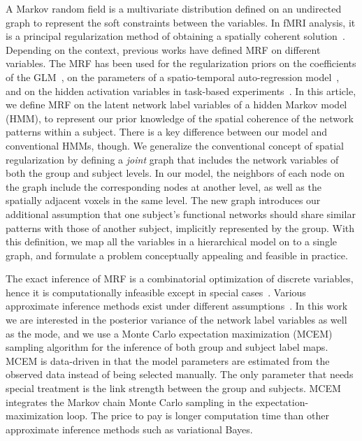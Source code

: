 \documentclass[review,authoryear]{elsarticle}
\begin{document}
A Markov random field is a multivariate distribution defined on an undirected
graph to represent the soft constraints between the variables. In fMRI analysis,
it is a principal regularization method of obtaining a spatially coherent
solution~\citep{descombes1998spatio, ou2010combining, ng2012modeling}. Depending on
the context, previous works have defined MRF on different variables.  The MRF
has been used for the regularization priors on the coefficients of the
GLM~\citep{penny2005bayesian}, on the parameters of a spatio-temporal
auto-regression model~\citep{woolrich2004fully}, and on the hidden activation
variables in task-based experiments~\citep{hartvig2000spatial}. In this article,
we define MRF on the latent network label variables of a hidden Markov model
(HMM), to represent our prior knowledge of the spatial coherence of the network
patterns within a subject. There is a key difference between our model and
conventional HMMs, though. We generalize the conventional concept of spatial
regularization by defining a \emph{joint} graph that includes the network
variables of both the group and subject levels. In our model, the neighbors of
each node on the graph include the corresponding nodes at another level, as well
as the spatially adjacent voxels in the same level. The new graph introduces our
additional assumption that one subject's functional networks should share
similar patterns with those of another subject, implicitly represented by the
group. With this definition, we map all the variables in a hierarchical model on
to a single graph, and formulate a problem conceptually appealing and feasible
in practice.

The exact inference of MRF is a combinatorial optimization of discrete
variables, hence it is computationally infeasible except in special
cases~\citep{greig1989exact,ng2012modeling}. Various approximate inference
methods exist under different assumptions~\citep{murphy1999loopy,
  boykov2001fast, jordan1998introduction}. In this work we are interested in the
posterior variance of the network label variables as well as the mode, and we
use a Monte Carlo expectation maximization (MCEM) sampling algorithm for the
inference of both group and subject label maps. MCEM is data-driven in that the
model parameters are estimated from the observed data instead of being selected
manually. The only parameter that needs special treatment is the link strength
between the group and subjects. MCEM integrates the Markov chain Monte Carlo
sampling in the expectation-maximization loop. The price to pay is longer
computation time than other approximate inference methods such as variational
Bayes.
\end{document}
